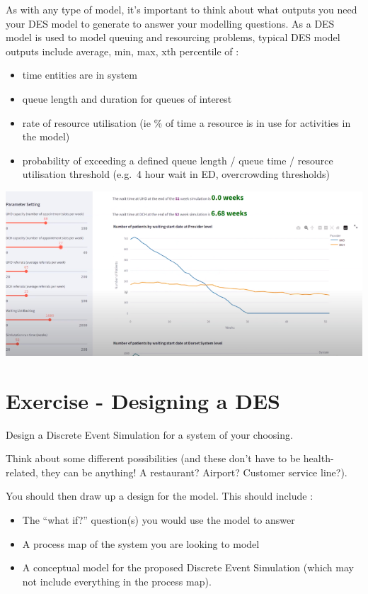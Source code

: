 \documentclass[
  letterpaper,
  DIV=11,
  numbers=noendperiod]{scrreprt}
\providecommand{\tightlist}{%
  \setlength{\itemsep}{0pt}\setlength{\parskip}{0pt}}\usepackage{longtable,booktabs,array}
\begin{document}
As with any type of model, it's important to think about what outputs
you need your DES model to generate to answer your modelling questions.
As a DES model is used to model queuing and resourcing problems, typical
DES model outputs include average, min, max, xth percentile of :

\begin{itemize}
\tightlist
\item
  time entities are in system
\item
  queue length and duration for queues of interest
\item
  rate of resource utilisation (ie \% of time a resource is in use for
  activities in the model)
\item
  probability of exceeding a defined queue length / queue time /
  resource utilisation threshold (e.g.~4 hour wait in ED, overcrowding
  thresholds)
\end{itemize}

\includegraphics{images/output_example_simple.png}

\chapter{Exercise - Designing a DES}\label{exercise---designing-a-des}

Design a Discrete Event Simulation for a system of your choosing.

Think about some different possibilities (and these don't have to be
health-related, they can be anything! A restaurant? Airport? Customer
service line?).

You should then draw up a design for the model. This should include :

\begin{itemize}
\tightlist
\item
  The ``what if?'' question(s) you would use the model to answer
\item
  A process map of the system you are looking to model
\item
  A conceptual model for the proposed Discrete Event Simulation (which
  may not include everything in the process map).
\end{itemize}
\end{document}
